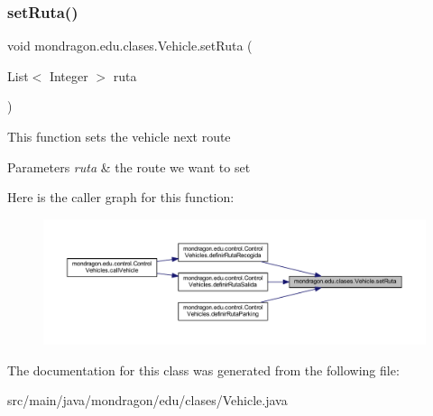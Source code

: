 \subsubsection{\texorpdfstring{setRuta()}{setRuta()}}
{\footnotesize\ttfamily void mondragon.\+edu.\+clases.\+Vehicle.\+set\+Ruta (\begin{DoxyParamCaption}\item[{List$<$ Integer $>$}]{ruta }\end{DoxyParamCaption})\hspace{0.3cm}{\ttfamily [inline]}}

This function sets the vehicle next route


\begin{DoxyParams}{Parameters}
{\em ruta} & the route we want to set \\
\hline
\end{DoxyParams}
Here is the caller graph for this function\+:\nopagebreak
\begin{figure}[H]
\begin{center}
\leavevmode
\includegraphics[width=350pt]{classmondragon_1_1edu_1_1clases_1_1_vehicle_a59e0fe87a465b6640295a76d3745a440_icgraph}
\end{center}
\end{figure}


The documentation for this class was generated from the following file\+:\begin{DoxyCompactItemize}
\item 
src/main/java/mondragon/edu/clases/Vehicle.\+java\end{DoxyCompactItemize}
